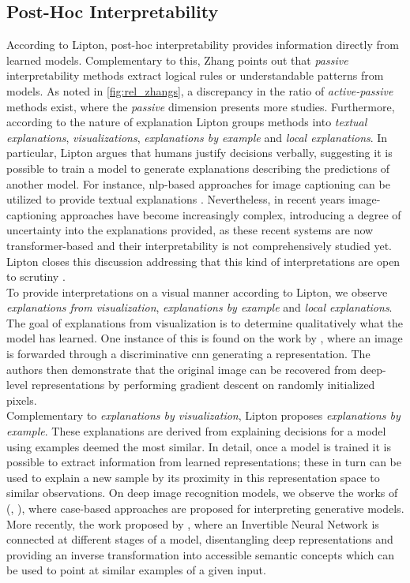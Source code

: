 \subsection{Post-Hoc Interpretability}
\label{rel:sub_post}
According to Lipton, post-hoc interpretability provides information directly from learned models. 
Complementary to this, Zhang points out that \emph{passive} interpretability methods extract 
logical rules or understandable patterns from models. As noted in \autoref{fig:rel_zhangs}, a 
discrepancy in the ratio of \emph{active-passive} methods exist, where the \emph{passive} 
dimension presents more studies. Furthermore, according to the nature of 
explanation Lipton groups methods into \emph{textual explanations}, \emph{visualizations}, 
\emph{explanations by example} and \emph{local explanations}. In particular, Lipton argues that 
humans justify decisions verbally, suggesting it is possible to train a model to generate 
explanations describing the predictions of another model. For instance, \gls{nlp}-based approaches 
for image captioning can be utilized to provide textual explanations \autocite{mcauley2013hidden}. 
Nevertheless, in recent years image-captioning approaches have become increasingly complex,
introducing a degree of uncertainty into the explanations provided, as these recent systems 
are now transformer-based and their interpretability is not comprehensively studied yet. Lipton 
closes this discussion addressing that this kind of interpretations are open to scrutiny 
\autocite{chang2009reading}.\\

\noindent To provide interpretations on a visual manner according to Lipton, we observe 
\emph{explanations from visualization}, \emph{explanations by example} and \emph{local explanations}. 
The goal of explanations from visualization is to determine qualitatively what the model has 
learned. One instance of this is found on the work by \cite{mahendran2015understanding}, where an 
image is forwarded through a discriminative \gls{cnn} generating a representation. The authors then 
demonstrate that the original image can be recovered from deep-level representations by performing 
gradient descent on randomly initialized pixels.\\

\noindent Complementary to \emph{explanations by visualization}, Lipton proposes \emph{explanations 
by example}. These explanations are derived from explaining decisions for a model using examples 
deemed the most similar. In detail, once a model is trained it is possible to extract information 
from learned representations; these in turn can be used to explain a new sample by its proximity 
in this representation space to similar observations. On deep image recognition models, we observe 
the works of (\cite{kim2014bayesian}, \cite{doshi2015graph}), where case-based approaches are 
proposed for interpreting generative models. More recently, the work proposed by 
\cite{rombach2020making}, where an Invertible Neural Network is connected at different stages of a 
model, disentangling deep representations and providing an inverse transformation into accessible 
semantic concepts which can be used to point at similar examples of a given input.\\

